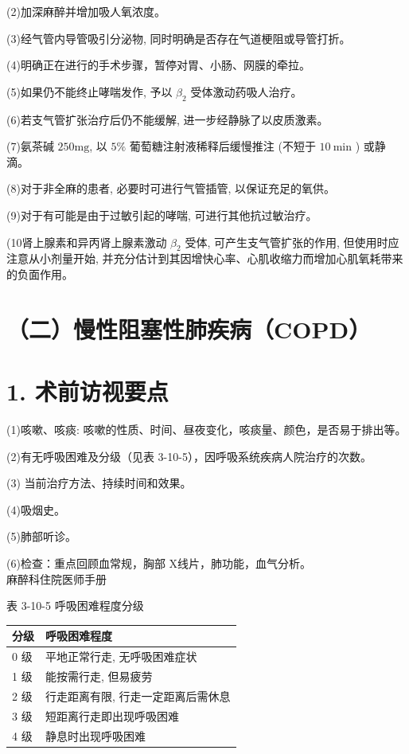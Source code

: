 \documentclass[10pt]{article}
\begin{document}
(2)加深麻醉并增加吸人氧浓度。

(3)经气管内导管吸引分泌物, 同时明确是否存在气道梗阻或导管打折。

(4)明确正在进行的手术步骤，暂停对胃、小肠、网膜的牵拉。

(5)如果仍不能终止哮喘发作, 予以 $\beta_{2}$ 受体激动药吸人治疗。

(6)若支气管扩张治疗后仍不能缓解, 进一步经静脉了以皮质激素。

(7)氨茶碱 $250 \mathrm{mg}$, 以 $5 \%$ 葡萄糖注射液稀释后缓慢推注 (不短于 $10 \mathrm{~min}$ ) 或静滴。

(8)对于非全麻的患者, 必要时可进行气管插管, 以保证充足的氧供。

(9)对于有可能是由于过敏引起的哮喘, 可进行其他抗过敏治疗。

(10肾上腺素和异丙肾上腺素激动 $\beta_{2}$ 受体, 可产生支气管扩张的作用, 但使用时应注意从小剂量开始, 并充分估计到其因增快心率、心肌收缩力而增加心肌氧耗带来的负面作用。

\section*{（二）慢性阻塞性肺疾病（COPD）}
\section*{1. 术前访视要点}
(1)咳嗽、咳痰: 咳嗽的性质、时间、昼夜变化，咳痰量、颜色，是否易于排出等。

(2)有无呼吸困难及分级（见表 3-10-5），因呼吸系统疾病人院治疗的次数。

(3) 当前治疗方法、持续时间和效果。

(4)吸烟史。

(5)肺部听诊。

(6)检查：重点回顾血常规，胸部 X线片，肺功能，血气分析。\\
麻醉科住院医师手册

表 3-10-5 呼吸困难程度分级

\begin{center}
\begin{tabular}{ll}
\hline
分级 & 呼吸困难程度 \\
\hline
0 级 & 平地正常行走, 无呼吸困难症状 \\
1 级 & 能按需行走, 但易疲劳 \\
2 级 & 行走距离有限, 行走一定距离后需休息 \\
3 级 & 短距离行走即出现呼吸困难 \\
4 级 & 静息时出现呼吸困难 \\
\hline
\end{tabular}
\end{center}
\end{document}
